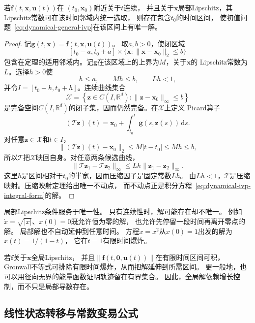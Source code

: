 \begin{theorem}[局部存在唯一性]
	\label{thm:dynamical-picard-lindelof} 若$\bm{f}(t,\bm{x},\bm{u}(t))$在 $(t_{0},
	\bm{x}_{0})$附近关于$t$连续， 并且关于$\bm{x}$局部Lipschitz，其Lipschitz常数可在该时间邻域内统一选取，
则存在包含$t_{0}$的时间区间，
	使初值问题~\eqref{eq:dynamical-general-ivp}在该区间上有唯一解。
\end{theorem}

\begin{proof}
	记$\bm{g}(t,\bm{x})=\bm{f}(t,\bm{x},\bm{u}(t))$。
	取$a,b>0$，使闭区域
	\[
		[t_0-a,t_0+a]\times
		\{\bm{x}:\lVert\bm{x}-\bm{x}_0\rVert_2\leq b\}
	\]
	包含在定理的适用邻域内。记$\bm{g}$在该区域上的上界为$M$，关于$\bm{x}$的
	Lipschitz常数为$L$。选择$h>0$使
	\[
		h\leq a,\qquad Mh\leq b,\qquad Lh<1,
	\]
	并令$I=[t_0-h,t_0+h]$。连续曲线集合
	\[
		\mathcal{X}
		=
		\left\{
			\bm{z}\in C(I,\mathbb R^d):
			\lVert\bm{z}-\bm{x}_0\rVert_\infty\leq b
		\right\}
	\]
	是完备空间$C(I,\mathbb{R}^d)$的闭子集，因而仍然完备。在$\mathcal{X}$上定义
	Picard算子
	\[
		(\mathcal{T}\bm{z})(t)
		=
		\bm{x}_{0}+\int_{t_0}^{t}\bm{g}(s,\bm{z}(s))\,\mathrm{d}s.
	\]
	对任意$\bm{z}\in\mathcal{X}$和$t\in I$，
	\[
		\lVert(\mathcal{T}\bm{z})(t)-\bm{x}_0\rVert_2
		\leq M|t-t_0|
		\leq Mh
		\leq b,
	\]
	所以$\mathcal{T}$把$\mathcal{X}$映回自身。对任意两条候选曲线，
	\[
		\lVert\mathcal{T}\bm{z}_{1}-\mathcal{T}\bm{z}_{2}\rVert_{\infty}
		\leq
		Lh\lVert\bm{z}_{1}-\bm{z}_{2}\rVert_{\infty}.
	\]
	这里$h$是区间相对于$t_0$的半宽，因而压缩因子是固定常数$Lh$。
	由$Lh<1$，$\mathcal{T}$是压缩映射。压缩映射定理给出唯一不动点，
	而不动点正是积分方程~\eqref{eq:dynamical-ivp-integral-form}的解。
\end{proof}

局部Lipschitz条件服务于唯一性。 只有连续性时，解可能存在却不唯一。 例如$\dot{x}=\sqrt{|x|}$、$x
(0)=0$既允许恒为零的解， 也允许先停留一段时间再离开零点的解。
局部解也不自动延伸到任意时间。 方程$\dot{x}=x^{2}$从$x(0)=1$出发的解为$x(t)=1/(1-
t)$， 它在$t=1$有限时间爆炸。

若$\bm{f}$关于$\bm{x}$全局Lipschitz， 并且$\lVert\bm{f}(t,\bm{0},\bm{u}(t))\rVert$在有限时间区间可积，
Gronwall不等式可排除有限时间爆炸，从而把解延伸到所需区间。 更一般地，也可以用径向无界的能量函数证明轨迹留在有界集合。
因此，全局解依赖增长控制，而不只是局部导数存在。

\subsection{线性状态转移与常数变易公式}

